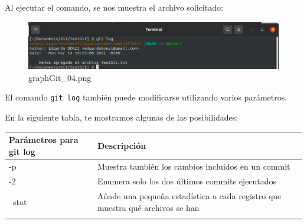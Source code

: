 \documentclass[11pt]{article}
\begin{document}
Al ejecutar el comando, se nos muestra el archivo solicitado:

    \begin{figure}
\centering
\includegraphics{graphGit_04.png}
\caption{graphGit\_04.png}
\end{figure}

    El comando \texttt{git\ log} también puede modificarse utilizando varios
parámetros.

En la siguiente tabla, te mostramos algunas de las posibilidades:

\begin{longtable}[]{@{}ll@{}}
\toprule
\begin{minipage}[b]{0.21\columnwidth}\raggedright
Parámetros para git log\strut
\end{minipage} & \begin{minipage}[b]{0.73\columnwidth}\raggedright
Descripción\strut
\end{minipage}\tabularnewline
\midrule
\endhead
\begin{minipage}[t]{0.21\columnwidth}\raggedright
-p\strut
\end{minipage} & \begin{minipage}[t]{0.73\columnwidth}\raggedright
Muestra también los cambios incluidos en un commit\strut
\end{minipage}\tabularnewline
\begin{minipage}[t]{0.21\columnwidth}\raggedright
-2\strut
\end{minipage} & \begin{minipage}[t]{0.73\columnwidth}\raggedright
Enumera solo los dos últimos commits ejecutados\strut
\end{minipage}\tabularnewline
\begin{minipage}[t]{0.21\columnwidth}\raggedright
--stat\strut
\end{minipage} & \begin{minipage}[t]{0.73\columnwidth}\raggedright
Añade una pequeña estadística a cada registro que muestra qué archivos
se han\strut
\end{minipage}\tabularnewline
\begin{minipage}[t]{0.21\columnwidth}\raggedright
\strut
\end{minipage} & \begin{minipage}[t]{0.73\columnwidth}\raggedright

\end{minipage}
\end{longtable}
\end{document}
